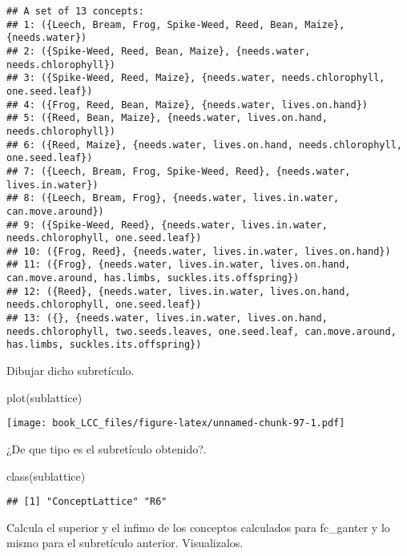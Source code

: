 \documentclass[
]{book}
\newenvironment{Shaded}{\begin{snugshade}}{\end{snugshade}}
\newcommand{\CommentTok}[1]{\textcolor[rgb]{0.56,0.35,0.01}{\textit{#1}}}
\newcommand{\DecValTok}[1]{\textcolor[rgb]{0.00,0.00,0.81}{#1}}
\newcommand{\FunctionTok}[1]{\textcolor[rgb]{0.00,0.00,0.00}{#1}}
\newcommand{\NormalTok}[1]{#1}
\newcommand{\OtherTok}[1]{\textcolor[rgb]{0.56,0.35,0.01}{#1}}
\newcommand{\SpecialCharTok}[1]{\textcolor[rgb]{0.00,0.00,0.00}{#1}}
\begin{document}
\begin{verbatim}
## A set of 13 concepts:
## 1: ({Leech, Bream, Frog, Spike-Weed, Reed, Bean, Maize}, {needs.water})
## 2: ({Spike-Weed, Reed, Bean, Maize}, {needs.water, needs.chlorophyll})
## 3: ({Spike-Weed, Reed, Maize}, {needs.water, needs.chlorophyll, one.seed.leaf})
## 4: ({Frog, Reed, Bean, Maize}, {needs.water, lives.on.hand})
## 5: ({Reed, Bean, Maize}, {needs.water, lives.on.hand, needs.chlorophyll})
## 6: ({Reed, Maize}, {needs.water, lives.on.hand, needs.chlorophyll, one.seed.leaf})
## 7: ({Leech, Bream, Frog, Spike-Weed, Reed}, {needs.water, lives.in.water})
## 8: ({Leech, Bream, Frog}, {needs.water, lives.in.water, can.move.around})
## 9: ({Spike-Weed, Reed}, {needs.water, lives.in.water, needs.chlorophyll, one.seed.leaf})
## 10: ({Frog, Reed}, {needs.water, lives.in.water, lives.on.hand})
## 11: ({Frog}, {needs.water, lives.in.water, lives.on.hand, can.move.around, has.limbs, suckles.its.offspring})
## 12: ({Reed}, {needs.water, lives.in.water, lives.on.hand, needs.chlorophyll, one.seed.leaf})
## 13: ({}, {needs.water, lives.in.water, lives.on.hand, needs.chlorophyll, two.seeds.leaves, one.seed.leaf, can.move.around, has.limbs, suckles.its.offspring})
\end{verbatim}

Dibujar dicho subretículo.

\begin{Shaded}
\begin{Highlighting}[]
\FunctionTok{plot}\NormalTok{(sublattice)}
\end{Highlighting}
\end{Shaded}

\texttt{[image: book\_LCC\_files/figure-latex/unnamed-chunk-97-1.pdf]}

¿De que tipo es el subretículo obtenido?.

\begin{Shaded}
\begin{Highlighting}[]
\FunctionTok{class}\NormalTok{(sublattice)}
\end{Highlighting}
\end{Shaded}

\begin{verbatim}
## [1] "ConceptLattice" "R6"
\end{verbatim}

Calcula el superior y el infimo de los conceptos calculados para fc\_ganter y lo mismo para el subretículo anterior. Visualizalos.

\begin{Shaded}
\end{Shaded}
\end{document}

